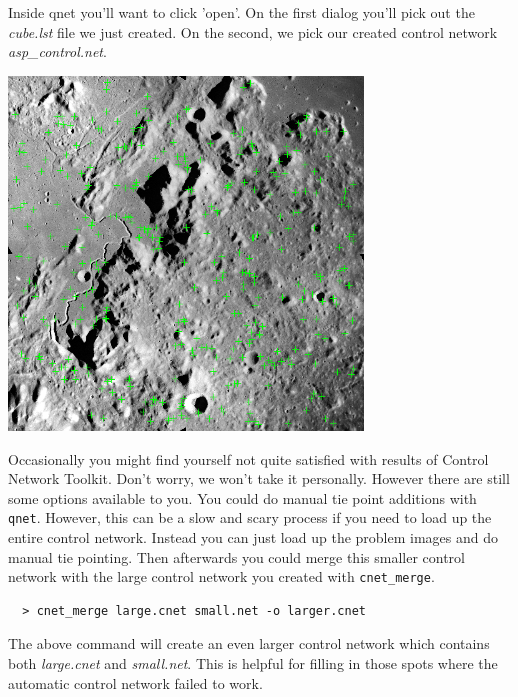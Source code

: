 Inside qnet you'll want to click 'open'. On the first dialog you'll
pick out the \emph{cube.lst} file we just created. On the second, we
pick our created control network \emph{asp\_control.net}.

\begin{center}
\includegraphics[height=3.7in]{images/cnettk_qnet_screen.png}
\end{center}

Occasionally you might find yourself not quite satisfied with results
of Control Network Toolkit. Don't worry, we won't take it
personally. However there are still some options available to you. You
could do manual tie point additions with \texttt{qnet}. However, this
can be a slow and scary process if you need to load up the entire
control network. Instead you can just load up the problem images and
do manual tie pointing. Then afterwards you could merge this smaller
control network with the large control network you created with
\texttt{cnet\_merge}.

\begin{verbatim}
  > cnet_merge large.cnet small.net -o larger.cnet
\end{verbatim}

The above command will create an even larger control network which
contains both \emph{large.cnet} and \emph{small.net}. This is helpful
for filling in those spots where the automatic control network failed
to work.

